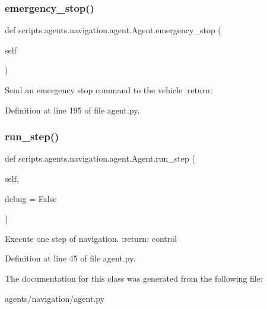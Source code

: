 \subsubsection{\texorpdfstring{emergency\+\_\+stop()}{emergency\_stop()}}
{\footnotesize\ttfamily def scripts.\+agents.\+navigation.\+agent.\+Agent.\+emergency\+\_\+stop (\begin{DoxyParamCaption}\item[{}]{self }\end{DoxyParamCaption})}

\begin{DoxyVerb}Send an emergency stop command to the vehicle
:return:
\end{DoxyVerb}
 

Definition at line 195 of file agent.\+py.

\mbox{\label{classscripts_1_1agents_1_1navigation_1_1agent_1_1Agent_a0271d9ffb0c84bae593bce700a9cf5bc}} 
\subsubsection{\texorpdfstring{run\+\_\+step()}{run\_step()}}
{\footnotesize\ttfamily def scripts.\+agents.\+navigation.\+agent.\+Agent.\+run\+\_\+step (\begin{DoxyParamCaption}\item[{}]{self,  }\item[{}]{debug = {\ttfamily False} }\end{DoxyParamCaption})}

\begin{DoxyVerb}Execute one step of navigation.
:return: control
\end{DoxyVerb}
 

Definition at line 45 of file agent.\+py.



The documentation for this class was generated from the following file\+:\begin{DoxyCompactItemize}
\item 
agents/navigation/agent.\+py\end{DoxyCompactItemize}
